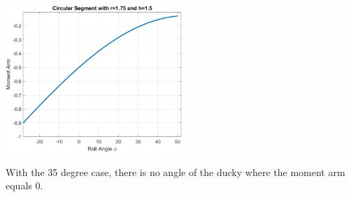 \begin{solution}
\begin{center}
    \includegraphics[width=0.5\textwidth]{img/e6p2e.png}
\end{center}

With the 35 degree case, there is no angle of the ducky where the moment arm equals 0.
\end{solution}